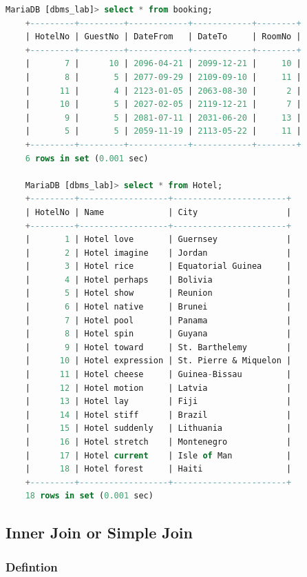 \documentclass[11pt]{article}
\begin{document}
\begin{lstlisting}[language=sql]
	MariaDB [dbms_lab]> select * from booking;
	+---------+---------+------------+------------+--------+
	| HotelNo | GuestNo | DateFrom   | DateTo     | RoomNo |
	+---------+---------+------------+------------+--------+
	|       7 |      10 | 2096-04-21 | 2099-12-21 |     10 |
	|       8 |       5 | 2077-09-29 | 2109-09-10 |     11 |
	|      11 |       4 | 2123-01-05 | 2063-08-30 |      2 |
	|      10 |       5 | 2027-02-05 | 2119-12-21 |      7 |
	|       9 |       5 | 2081-07-11 | 2031-06-20 |     13 |
	|       5 |       5 | 2059-11-19 | 2113-05-22 |     11 |
	+---------+---------+------------+------------+--------+
	6 rows in set (0.001 sec)
	
	MariaDB [dbms_lab]> select * from Hotel;
	+---------+------------------+-----------------------+
	| HotelNo | Name             | City                  |
	+---------+------------------+-----------------------+
	|       1 | Hotel love       | Guernsey              |
	|       2 | Hotel imagine    | Jordan                |
	|       3 | Hotel rice       | Equatorial Guinea     |
	|       4 | Hotel perhaps    | Bolivia               |
	|       5 | Hotel show       | Reunion               |
	|       6 | Hotel native     | Brunei                |
	|       7 | Hotel pool       | Panama                |
	|       8 | Hotel spin       | Guyana                |
	|       9 | Hotel toward     | St. Barthelemy        |
	|      10 | Hotel expression | St. Pierre & Miquelon |
	|      11 | Hotel cheese     | Guinea-Bissau         |
	|      12 | Hotel motion     | Latvia                |
	|      13 | Hotel lay        | Fiji                  |
	|      14 | Hotel stiff      | Brazil                |
	|      15 | Hotel suddenly   | Lithuania             |
	|      16 | Hotel stretch    | Montenegro            |
	|      17 | Hotel current    | Isle of Man           |
	|      18 | Hotel forest     | Haiti                 |
	+---------+------------------+-----------------------+
	18 rows in set (0.001 sec)
\end{lstlisting}

\subsection{Inner Join or Simple Join}

\subsubsection*{Defintion}
\end{document}
